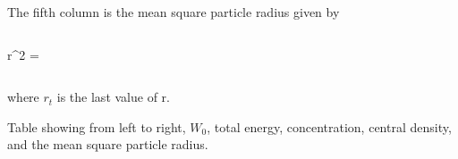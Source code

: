 The fifth column is the mean square particle radius given by
\begin{column}
\langle r^2 \rangle = 
\end{column}
where $r_t$ is the last value of r.




\begin{table*}
    \centering
    
    \caption{Table showing from left to right, $W_0$, total energy, concentration, central density, and the mean square particle radius.}
    \label{tab:KingModel}
\end{table*}
